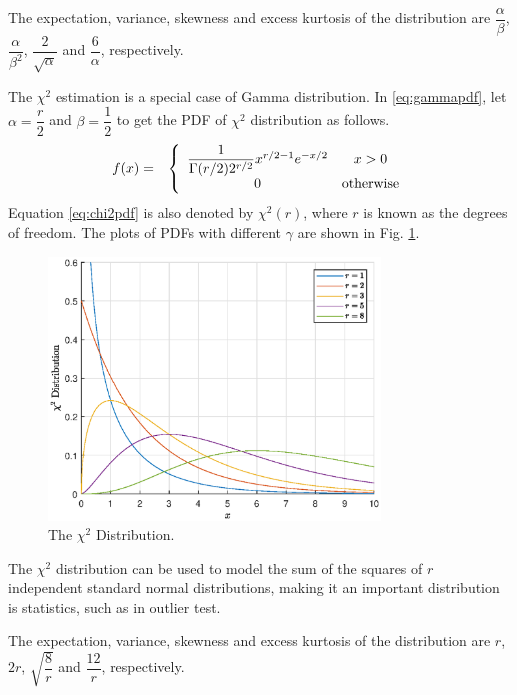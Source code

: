 The expectation, variance, skewness and excess kurtosis of the distribution are $\dfrac{\alpha}{\beta}$, $\dfrac{\alpha}{\beta^2}$, $\dfrac{2}{\sqrt{\alpha}}$ and $\dfrac{6}{\alpha}$, respectively.

The $\chi^2$ estimation is a special case of Gamma distribution. In \eqref{eq:gammapdf}, let $\alpha = \dfrac{r}{2}$ and $\beta=\dfrac{1}{2}$ to get the PDF of $\chi^2$ distribution as follows.
\begin{eqnarray}
  f(x) &=& \left\{\begin{array}{cc}
                    \dfrac{1}{\Gamma(r/2)2^{r/2}}x^{r/2-1}e^{-x/2} & x > 0  \\
                    0 & \textup{otherwise}
                  \end{array}\right. \label{eq:chi2pdf}
\end{eqnarray}
Equation \eqref{eq:chi2pdf} is also denoted by $\chi^2(r)$, where $r$ is known as the degrees of freedom. The plots of PDFs with different $\gamma$ are shown in Fig. \ref{fig:chi2_pdf}.
\begin{figure}
	\centering
	\includegraphics[width=250pt]{chapters/part-1/figures/chi2_pdf.eps}
	\caption{The $\chi^2$ Distribution.} \label{fig:chi2_pdf}
\end{figure}

The $\chi^2$ distribution can be used to model the sum of the squares of $r$ independent standard normal distributions, making it an important distribution is statistics, such as in outlier test. 

The expectation, variance, skewness and excess kurtosis of the distribution are $r$, $2r$, $\sqrt{\dfrac{8}{r}}$ and $\dfrac{12}{r}$, respectively.

